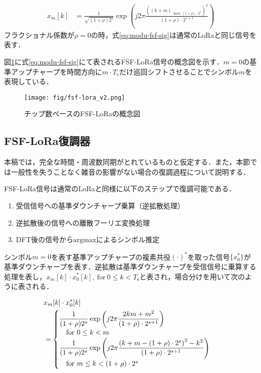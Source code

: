 \documentclass[technicalreport]{ieicej}
\begin{document}
\begin{align}\label{eq:modu-fsf-sig}
    x_m[k]&=\frac{1}{\sqrt{(1+\rho)2^s}}\exp\left(j2\pi \frac{\left((k+m)_{\bmod (1+\rho)\cdot 2^s}\right)^2}{(1+\rho) \cdot 2^{s+1}}\right)
\end{align}
フラクショナル係数が$\rho=0$の時，式\eqref{eq:modu-fsf-sig}は通常のLoRaと同じ信号を表す．

図\ref{fig:fsf-lora}に式\eqref{eq:modu-fsf-sig}にて表されるFSF-LoRa信号の概念図を示す．$m=0$の基準アップチャープを時間方向に$m\cdot T_\mathrm{c}$だけ巡回シフトさせることでシンボル$m$を表現している．

\begin{figure}[t] 
\centering
\texttt{[image: fig/fsf-lora\_v2.png]}
\caption{チップ数ベースのFSF-LoRaの概念図}
\label{fig:fsf-lora}
\end{figure}

\subsection{FSF-LoRa復調器}\label{sec:demodu}
本稿では，完全な時間・周波数同期がとれているものと仮定する．また，本節では一般性を失うことなく雑音の影響がない場合の復調過程について説明する．

FSF-LoRa信号は通常のLoRaと同様に以下のステップで復調可能である．

\begin{enumerate}
    \item 受信信号への基準ダウンチャープ乗算（逆拡散処理）
    \item 逆拡散後の信号への離散フーリエ変換処理
    \item DFT後の信号から$\mathrm{argmax}$によるシンボル推定
\end{enumerate}


シンボル$m=0$を表す基準アップチャープの複素共役$(\cdot)^*$を取った信号$\{x_0^*\}$が基準ダウンチャープを表す．逆拡散は基準ダウンチャープを受信信号に乗算する処理を表し，$x_m[k]\cdot x_0^*[k],\ \mathrm{for}\ 0\le k< T_\mathrm{s}$と表され，場合分けを用いて次のように表される．%

\begin{align}\label{eq:de-spreading_signal}
 &x_m[k]\cdot x_0^*[k]\notag\\
&=\begin{cases}
\displaystyle \frac{1}{{(1+\rho)2^s}}\exp\left(j2\pi \frac{2km+m^2}{(1+\rho)  \cdot 2^{s+1}}\right)\\
\quad \mathrm{for}\ 0\le k < m\\
\displaystyle \frac{1}{{(1+\rho)2^s}}\exp\left(j2\pi \frac{\left(k+m-(1+\rho)\cdot 2^s\right)^2-k^2}{(1+\rho)  \cdot 2^{s+1}}\right)\\
\quad \mathrm{for}\ m\le k<(1+\rho)\cdot 2^s\\
\end{cases}
\end{align}
\end{document}

